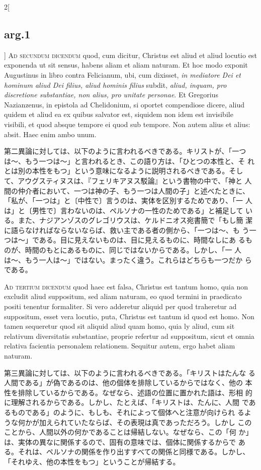 \documentclass[paper=a4paper,fontsize=10pt,jafontsize=9pt,titlepage]{jlreq}
\begin{document}
\begin{paracol}{2}[\subsection{arg.1}]
{\scshape Ad secundum dicendum} quod, cum dicitur, Christus est aliud
et aliud locutio est exponenda ut sit sensus, habens aliam et aliam
naturam. Et hoc modo exponit Augustinus in libro contra Felicianum,
ubi, cum dixisset, {\itshape in mediatore Dei et hominum aliud Dei
filius, aliud hominis filius} subdit, {\itshape aliud, inquam, pro
discretione substantiae, non alius, pro unitate personae}. Et
Gregorius Nazianzenus, in epistola ad Chelidonium, si oportet
compendiose dicere, aliud quidem et aliud ea ex quibus salvator est,
siquidem non idem est invisibile visibili, et quod absque tempore ei
quod sub tempore. Non autem alius et alius: absit. Haec enim ambo
unum.

\switchcolumn

第二異論に対しては、以下のように言われるべきである。キリストが、「一つ
は〜、もう一つは〜」と言われるとき、この語り方は、「ひとつの本性と、そ
れとは別の本性をもつ」という意味になるように説明されるべきである。そし
て、アウグスティヌスは、『フェリキアヌス駁論』という書物の中で、「神と
人間の仲介者において、一つは神の子、もう一つは人間の子」と述べたときに、
「私が、「一つは」と〔中性で〕言うのは、実体を区別するためであり、「一
人は」と〔男性で〕言わないのは、ペルソナの一性のためである」と補足して
いる。また、ナジアンゾスのグレゴリウスは、ケルドニオス宛書簡で「もし簡
潔に語らなければならないならば、救い主である者の側から、「一つは〜、も
う一つは〜」である。目に見えないものは、目に見えるものに、時間なしにあ
るものが、時間のもとにあるものに、同じではないからである。しかし、「一
人は〜、もう一人は〜」ではない。まったく違う。これらはどちらも一つだか
らである。

\switchcolumn*[\subsection{ad.3}]

{\scshape Ad tertium dicendum} quod haec est falsa, Christus est
tantum homo, quia non excludit aliud suppositum, sed aliam naturam, eo
quod termini in praedicato positi tenentur formaliter. Si vero
adderetur aliquid per quod traheretur ad suppositum, esset vera
locutio, puta, Christus est tantum id quod est homo. Non tamen
sequeretur quod sit aliquid aliud quam homo, quia ly aliud, cum sit
relativum diversitatis substantiae, proprie refertur ad suppositum,
sicut et omnia relativa facientia personalem relationem. Sequitur
autem, ergo habet aliam naturam.

\switchcolumn

第三異論に対しては、以下のように言われるべきである。「キリストはたんな
る人間である」が偽であるのは、他の個体を排除しているからではなく、他の
本性を排除しているからである。なぜなら、述語の位置に置かれた語は、形相
的に理解されるからである。しかし、たとえば、「キリストは、たんに、人間
であるものである」のように、もしも、それによって個体へと注意が向けられ
るような何かが加えられていたならば、その表現は真であっただろう。しかし
このことから、人間以外の何かであることは帰結しない。なぜなら、この「何
か」は、実体の異なに関係するので、固有の意味では、個体に関係するからで
ある。それは、ペルソナの関係を作り出すすべての関係と同様である。しかし、
「それゆえ、他の本性をもつ」ということが帰結する。


\end{paracol}
\end{document}
